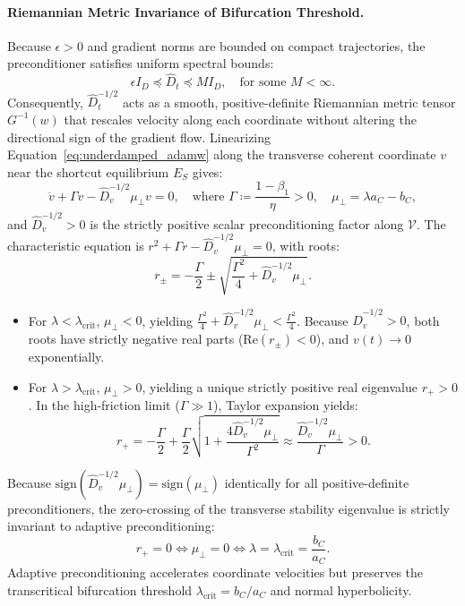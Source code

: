\documentclass{article}
\theoremstyle{plain}
\theoremstyle{definition}
\begin{document}
\paragraph{Riemannian Metric Invariance of Bifurcation Threshold.}
Because $\epsilon > 0$ and gradient norms are bounded on compact trajectories, the preconditioner satisfies uniform spectral bounds:
\begin{equation}
    \epsilon I_D \preceq \hat{D}_t \preceq M I_D, \quad \text{for some } M < \infty.
\end{equation}
Consequently, $\hat{D}_t^{-1/2}$ acts as a smooth, positive-definite Riemannian metric tensor $G^{-1}(w)$ that rescales velocity along each coordinate without altering the directional sign of the gradient flow.
Linearizing Equation~\eqref{eq:underdamped_adamw} along the transverse coherent coordinate $v$ near the shortcut equilibrium $E_S$ gives:
\begin{equation}
    \ddot{v} + \Gamma \dot{v} - \hat{D}_v^{-1/2} \mu_{\perp} v = 0, \quad \text{where } \Gamma \coloneqq \frac{1 - \beta_1}{\eta} > 0, \quad \mu_{\perp} = \lambda a_C - b_C,
\end{equation}
and $\hat{D}_v^{-1/2} > 0$ is the strictly positive scalar preconditioning factor along $\mathcal{V}$.
The characteristic equation is $r^2 + \Gamma r - \hat{D}_v^{-1/2} \mu_{\perp} = 0$, with roots:
\begin{equation}
    r_{\pm} = -\frac{\Gamma}{2} \pm \sqrt{\frac{\Gamma^2}{4} + \hat{D}_v^{-1/2} \mu_{\perp}}.
\end{equation}
\begin{itemize}[leftmargin=*]
    \item For $\lambda < \lambda_{\text{crit}}$, $\mu_{\perp} < 0$, yielding $\frac{\Gamma^2}{4} + \hat{D}_v^{-1/2} \mu_{\perp} < \frac{\Gamma^2}{4}$. Because $\hat{D}_v^{-1/2} > 0$, both roots have strictly negative real parts ($\text{Re}(r_{\pm}) < 0$), and $v(t) \to 0$ exponentially.
    \item For $\lambda > \lambda_{\text{crit}}$, $\mu_{\perp} > 0$, yielding a unique strictly positive real eigenvalue $r_+ > 0$. In the high-friction limit ($\Gamma \gg 1$), Taylor expansion yields:
    \begin{equation}
        r_+ = -\frac{\Gamma}{2} + \frac{\Gamma}{2} \sqrt{1 + \frac{4 \hat{D}_v^{-1/2} \mu_{\perp}}{\Gamma^2}} \approx \frac{\hat{D}_v^{-1/2} \mu_{\perp}}{\Gamma} > 0.
    \end{equation}
\end{itemize}
Because $\text{sign}(\hat{D}_v^{-1/2} \mu_\perp) = \text{sign}(\mu_\perp)$ identically for all positive-definite preconditioners, the zero-crossing of the transverse stability eigenvalue is strictly invariant to adaptive preconditioning:
\begin{equation}
    r_+ = 0 \iff \mu_\perp = 0 \iff \lambda = \lambda_{\text{crit}} = \frac{b_C}{a_C}.
\end{equation}
Adaptive preconditioning accelerates coordinate velocities but preserves the transcritical bifurcation threshold $\lambda_{\text{crit}} = b_C / a_C$ and normal hyperbolicity.
\end{document}

